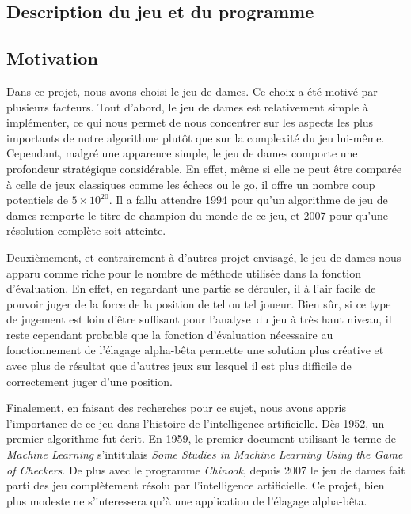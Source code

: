 \documentclass[a4paper,11pt]{article}
\begin{document}
\begin{multicols}{2}[]

\section{Description du jeu et du programme}

  \subsection{Motivation}

    Dans ce projet, nous avons choisi le jeu de dames. Ce choix a été motivé par
    plusieurs facteurs. Tout d'abord, le jeu de dames est relativement simple à
    implémenter, ce qui nous permet de nous concentrer sur les aspects les plus
    importants de notre algorithme plutôt que sur la complexité du jeu lui-même.
    Cependant, malgré une apparence simple, le jeu de dames comporte une
    profondeur stratégique considérable. En effet, même si elle ne peut être
    comparée à celle de jeux classiques comme les échecs ou le go, il offre un
    nombre coup potentiels de $5 \times 10^{20}$. Il a fallu attendre 1994 pour
    qu'un algorithme de jeu de dames remporte le titre de champion du monde de
    ce jeu, et 2007 pour qu'une résolution complète soit atteinte.

    Deuxièmement, et contrairement à d'autres projet envisagé, le jeu de dames
    nous apparu comme riche pour le nombre de méthode utilisée dans la fonction
    d'évaluation. En effet, en regardant une partie se dérouler, il à l'air
    facile de pouvoir juger de la force de la position de tel ou tel joueur.
    Bien sûr, si ce type de jugement est loin d'être suffisant pour
    l'analyse du jeu à très haut niveau, il reste cependant probable que la
    fonction d'évaluation nécessaire au fonctionnement de l'élagage alpha-bêta
    permette une solution plus créative et avec plus de résultat que d'autres
    jeux sur lesquel il est plus difficile de correctement juger d'une
    position.

    Finalement, en faisant des recherches pour ce sujet, nous avons appris
    l'importance de ce jeu dans l'histoire de l'intelligence artificielle.  Dès
    1952, un premier algorithme fut écrit. En 1959, le premier document
    utilisant le terme de \emph{Machine Learning} s'intitulais \emph{Some
    Studies in Machine Learning Using the Game of Checkers}. De plus avec le
    programme \emph{Chinook}, depuis 2007 le jeu de dames fait parti des jeu
    complètement résolu par l'intelligence artificielle. Ce projet, bien plus
    modeste ne s'interessera qu'à une application de l'élagage alpha-bêta.


\end{multicols}
\end{document}
